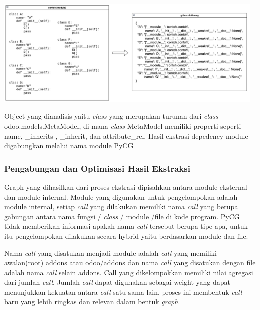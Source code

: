 \begin{center}
	\includegraphics[width=13cm]{img/bab_3/inspectSample.png}
	\label{contoh_json_pycg}
\end{center}

Object yang dianalisis yaitu \textit{class} yang merupakan turunan dari \textit{class} odoo.models.MetaModel, di mana \textit{class} MetaModel memiliki properti seperti  name, \_inherits , \_inherit, dan attribute\_rel. Hasil ekstrasi depedency module digabungkan melalui nama module PyCG 
\\
\subsubsection{Pengabungan dan Optimisasi Hasil Ekstraksi}
Graph yang dihasilkan dari proses ekstrasi dipisahkan antara module eksternal dan module internal. Module yang digunakan untuk pengelompokan adalah module internal, setiap \textit{call} yang dilakukan memiliki nama \textit{call} yang berupa gabungan antara nama fungsi / \textit{class} / module /file di kode program. PyCG tidak memberikan informasi apakah nama \textit{call} tersebut berupa tipe apa, untuk itu pengelompokan dilakukan secara hybrid yaitu berdasarkan module dan file. 


Nama \textit{call} yang disatukan menjadi module adalah \textit{call} yang memiliki awalan(root) addons atau odoo/addons dan nama \textit{call} yang disatukan dengan file adalah nama \textit{call} selain addons. Call yang dikelompokkan memiliki nilai agregasi dari jumlah \textit{call}. Jumlah \textit{call} dapat digunakan sebagai weight yang dapat menunjukkan kekuatan antara \textit{call} satu sama lain, proses ini membentuk \textit{call} baru yang lebih ringkas dan relevan dalam bentuk \textit{graph}. 


